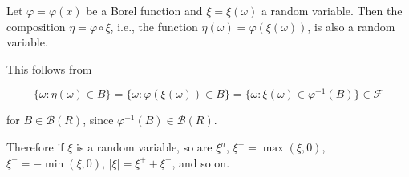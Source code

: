 Let $\varphi = \varphi(x)$ be a Borel function and $\xi = \xi(\omega)$ a random variable. Then the composition $\eta = \varphi \circ \xi$, i.e., the function $\eta(\omega) = \varphi(\xi(\omega))$, is also a random variable.

This follows from

$$\{\omega : \eta(\omega) \in B\} = \{\omega : \varphi(\xi(\omega)) \in B\} = \{\omega : \xi(\omega) \in \varphi^{-1}(B)\} \in \mathcal{F}$$

for $B \in \mathcal{B}(R)$, since $\varphi^{-1}(B) \in \mathcal{B}(R)$.

Therefore if $\xi$ is a random variable, so are $\xi^n$, $\xi^+ = \max(\xi, 0)$, $\xi^- = -\min(\xi, 0)$, $|\xi| = \xi^+ + \xi^-$, and so on.
